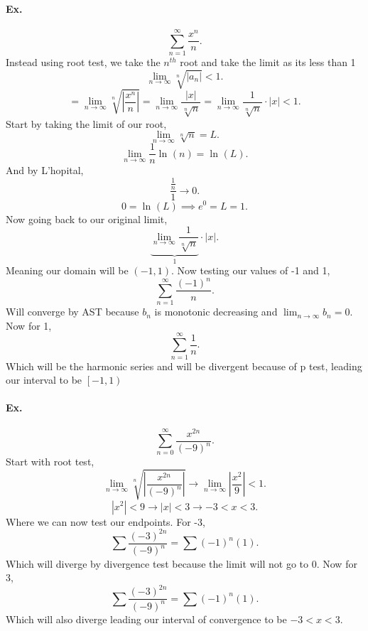 \paragraph{Ex.}
\[
\sum_{ n=1 } ^{ \infty } \frac{ x^{ n } }{ n }
.\] 
Instead using root test, we take the $ n^{ th }$ root and take the limit as its less than 1
\[
\lim_{ n \to \infty} \sqrt[ n ]{ \left| a_n \right| } < 1
.\] 
\[
=\lim_{ n \to \infty} \sqrt[ n ]{ \left| \frac{ x^{ n } }{ n } \right| } = \lim_{ n \to \infty} \frac{ \left| x \right| }{ \sqrt[ n ]{ n }  } = \lim_{ n \to \infty} \frac{ 1 }{ \sqrt[ n ]{ n }  } \cdot \left| x \right| < 1
.\] 
Start by taking the limit of our root,
\[
\lim_{ n \to \infty} \sqrt[ n ]{ n } =L
.\] 
\[
\lim_{ n \to \infty} \frac{ 1 }{ n } \ln^{  } \left( n \right) = \ln^{  } \left( L \right)
.\] 
And by L'hopital,
\[
\frac{ \frac{ 1 }{ n }  }{ 1 }\to 0
.\] 
\[
0=\ln^{  } \left( L \right) \implies e^{ 0 }= L = 1
.\] 
Now going back to our original limit,
\[
	\underbrace{\lim_{ n \to \infty} \frac{ 1 }{ \sqrt[ n ]{ n }  } }_{1} \cdot \left| x \right|
.\] 
Meaning our domain will be $ \left( -1,1 \right)  $. Now testing our values of -1 and 1,
\[
\sum_{ n=1 } ^{ \infty } \frac{ \left( -1 \right) ^{ n } }{ n }
.\] 
Will converge by AST because $ b_n $ is monotonic decreasing and $ \lim_{ n \to \infty} b_n = 0 $. Now for 1,
\[
\sum_{ n=1 } ^{ \infty } \frac{ 1 }{ n } 
.\] 
Which will be the harmonic series and will be divergent because of p test, leading our interval to be $ \left[ -1,1 \right) $

\paragraph{Ex.}
\[
\sum_{ n=0 } ^{ \infty } \frac{ x^{ 2n } }{ \left( -9 \right) ^{ n } }
.\] 
Start with root test,
\[
\lim_{ n \to \infty} \sqrt[ n ]{ \left| \frac{ x^{ 2n } }{ \left( -9 \right) ^{ n } } \right| } \to \lim_{ n \to \infty} \left| \frac{ x^2 }{ 9 }  \right| < 1
.\] 
\[
\left| x^2 \right|<9 \to \left| x \right| < 3 \to -3< x < 3
.\] 
Where we can now test our endpoints. For -3,
\[
\sum_{ } ^{  } \frac{ \left( -3 \right)^{ 2n }  }{ \left( -9 \right) ^{ n } }= \sum_{  } ^{  } \left( -1 \right) ^{ n }\left( 1 \right) 
.\] 
Which will diverge by divergence test because the limit will not go to 0. Now for 3,
\[
\sum_{  } ^{  } \frac{ \left( -3 \right) ^{ 2n } }{ \left( -9 \right) ^{ n } }= \sum_{  } ^{  } \left( -1 \right) ^{ n }\left( 1 \right) 
.\] 
Which will also diverge leading our interval of convergence to be $ -3 < x < 3 $.
